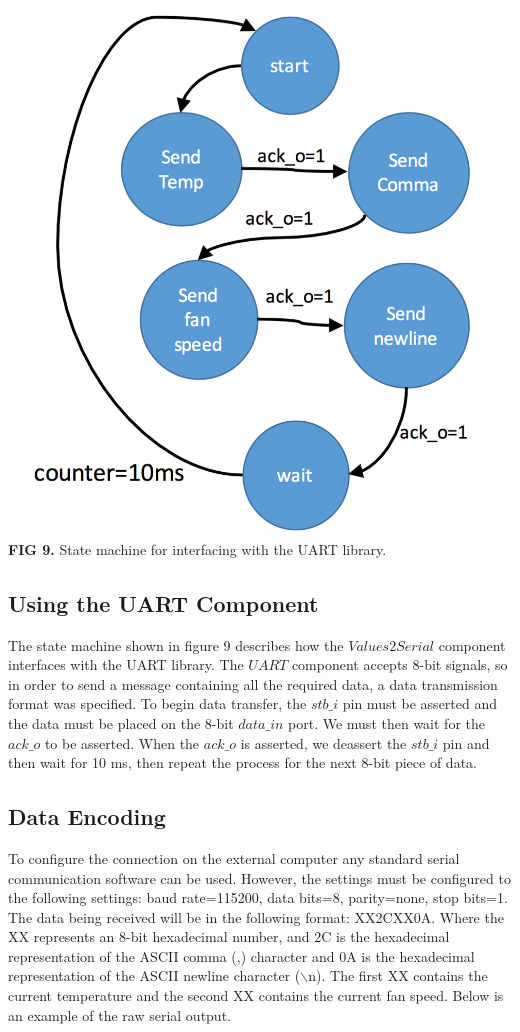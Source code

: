 \documentclass{article}
\begin{document}
\begin{center}
\includegraphics[scale=.35]{images/uartState}\\
\textbf{FIG 9.} State machine for interfacing with the UART library.\\
\end{center}
\subsection{Using the UART Component}
The state machine shown in figure 9 describes how the $Values2Serial$ component interfaces with the UART library. The $UART$ component accepts 8-bit signals, so in order to send a message containing all the required data, a data transmission format was specified. To begin data transfer, the $stb\_i$ pin must be asserted and the data must be placed on the 8-bit $data\_in$ port. We must then wait for the $ack\_o$ to be asserted. When the $ack\_o$ is asserted, we deassert the $stb\_i$ pin and then wait for 10 ms, then repeat the process for the next 8-bit piece of data. 
\subsection{Data Encoding}
	To configure the connection on the external computer any standard serial communication software can be used. However, the settings must be configured to the following settings: baud rate=115200, data bits=8, parity=none, stop bits=1. The data being received will be in the following format: XX2CXX0A. Where the XX represents an 8-bit hexadecimal number, and 2C is the hexadecimal representation of the ASCII comma (,) character and 0A is the hexadecimal representation of the ASCII newline character ($\backslash$n). The first XX contains the current temperature and the second XX contains the current fan speed. Below is an example of the raw serial output. 
\end{document}

